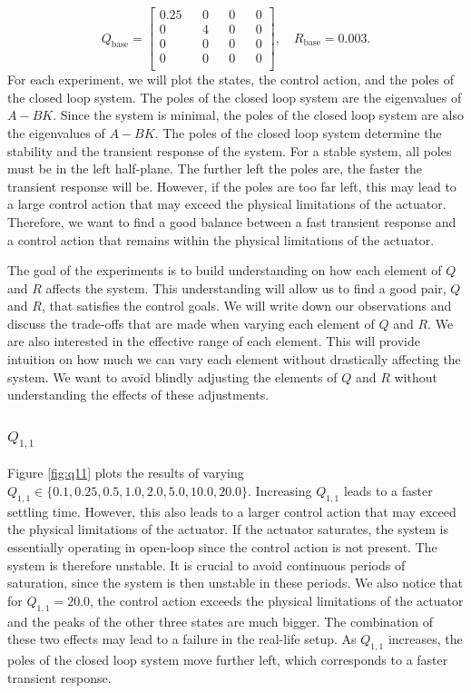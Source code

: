 \documentclass[a4paper,10pt]{article}
\theoremstyle{bluehomework}
\numberwithin{equation}{section}
\begin{document}
\begin{equation}
  Q_{\text{base}} = 
  \begin{bmatrix}
     0.25 && 0 && 0 && 0 \\
    0 && 4 && 0 && 0 \\
    0 && 0 && 0 && 0 \\
    0 && 0 && 0 && 0 \\
  \end{bmatrix}, \quad
  R_{\text{base}} = 0.003.
\end{equation}
For each experiment, we will plot the states, the control action, and the poles of the closed loop system. The poles of the closed loop system are the eigenvalues of $A-BK$. Since the system is minimal, the poles of the closed loop system are also the eigenvalues of $A-BK$. The poles of the closed loop system determine the stability and the transient response of the system. For a stable system, all poles must be in the left half-plane. The further left the poles are, the faster the transient response will be. However, if the poles are too far left, this may lead to a large control action that may exceed the physical limitations of the actuator. Therefore, we want to find a good balance between a fast transient response and a control action that remains within the physical limitations of the actuator.
\medskip

The goal of the experiments is to build understanding on how each element of $Q$ and $R$ affects the system. This understanding will allow us to find a good pair, $Q$ and $R$, that satisfies the control goals. We will write down our observations and  discuss the trade-offs that are made when varying each element of $Q$ and $R$. We are also interested in the effective range of each element. This will provide intuition on how much we can vary each element without drastically affecting the system. We want to avoid blindly adjusting the elements of $Q$ and $R$ without understanding the effects of these adjustments. 

\subsubsection{$Q_{1,1}$}

Figure \ref{fig:q11} plots the results of varying $Q_{1,1} \in \{0.1, 0.25, 0.5, 1.0, 2.0, 5.0, 10.0, 20.0\}$. Increasing $Q_{1,1}$ leads to a faster settling time. However, this also leads to a larger control action that may exceed the physical limitations of the actuator. If the actuator saturates, the system is essentially operating in open-loop since the control action is not present. The system is therefore unstable. It is crucial to avoid continuous periods of saturation, since the system is then unstable in these periods. We also notice that for $Q_{1,1} = 20.0$, the control action exceeds the physical limitations of the actuator and the peaks of the other three states are much bigger. The combination of these two effects may lead to a failure in the real-life setup. As $Q_{1,1}$ increases, the poles of the closed loop system move further left, which corresponds to a faster transient response.
\medskip
\end{document}
